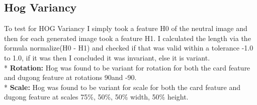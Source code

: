 \documentclass[conference]{IEEEtran}
\begin{document}
\subsection{Hog Variancy}
To test for HOG Variancy I simply took a feature H0 of the neutral image and then for each generated image took a feature H1.
I calculated the length via the formula normalize(H0 - H1) and checked if that was valid within a tolerance -1.0 to 1.0, if it was then
I concluded it was invariant, else it is variant.\\*
\textbf{Rotation: }Hog was found to be variant for rotation for both the card feature and dugong feature at rotations 90\degree and -90\degree.\\*
\textbf{Scale: }Hog was found to be variant for scale for both the card feature and dugong feature at scales 75\%, 50\%, 50\% width, 50\% height.
\end{document}
